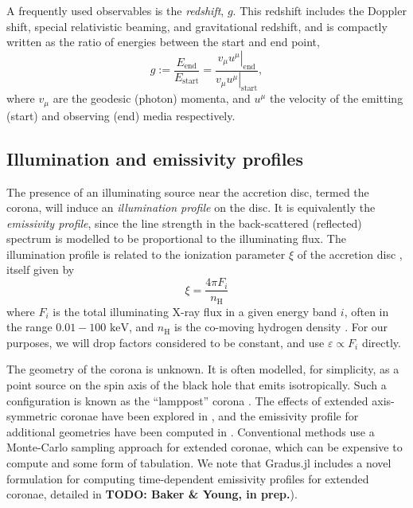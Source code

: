 \documentclass[fleqn,usenatbib]{mnras}
\newcommand{\todo}[1]{{\noindent \bf \color{red} TODO: #1}}
\newcommand{\Gradus}{Gradus.jl\xspace}
\begin{document}
A frequently used observables is the \emph{redshift}, $g$. This redshift
includes the Doppler shift, special relativistic beaming, and gravitational
redshift, and is compactly written as the ratio of energies between the start
and end point,
\begin{equation}
\label{eq:redshift}
g := \frac{E_\text{end}}{E_\text{start}} = \frac{\left. v_\mu u^\mu
\right\rvert_\text{end}}{\left. v_\mu u^\mu \right\rvert_{\text{start}}},
\end{equation}
where $v_\mu$ are the geodesic (photon) momenta, and $u^\mu$ the velocity of the
emitting (start) and observing (end) media respectively.



\subsection{Illumination and emissivity profiles}
\label{sec:emissivity-profiles}

The presence of an illuminating source near the accretion disc, termed the
corona\citep{svensson_corona_1994}, will induce an \emph{illumination profile}
on the disc. It is equivalently the \emph{emissivity profile}, since the line
strength in the back-scattered (reflected) spectrum is modelled to be
proportional to the illuminating flux.  The illumination profile is related to
the ionization parameter $\xi$ of the accretion disc
\citep{laor_line_1991,ross_reflection_1993, wilkins_understanding_2012}, itself
given by
\begin{equation}
    \xi = \frac{4 \pi F_i}{n_\text{H}}
\end{equation}
where $F_i$ is the total illuminating X-ray flux in a given energy band $i$, often in the range $0.01 - 100
\text{ keV}$, and $n_\text{H}$ is the co-moving hydrogen density
\citep{ross_effects_1993}.
For our purposes, we will drop factors considered to be constant, and use
$\varepsilon \propto F_i$ directly.

The geometry of the corona is unknown. It is often modelled, for simplicity, as
a point source on the spin axis of the black hole that emits isotropically. Such
a configuration is known as the ``lamppost'' corona
\citep[e.g.][]{fukumura_accretion_2007}.  The effects of extended axis-symmetric
coronae have been explored in \citet{wilkins_towards_2016}, and the emissivity
profile for additional geometries have been computed in
\citet{gonzalez_probing_2017}. Conventional methods use a Monte-Carlo sampling
approach for extended coronae, which can be expensive to compute and some form
of tabulation. We note that \Gradus includes a novel formulation for computing
time-dependent emissivity profiles for extended coronae, detailed in \todo{Baker
\& Young, in prep.}).
\end{document}
